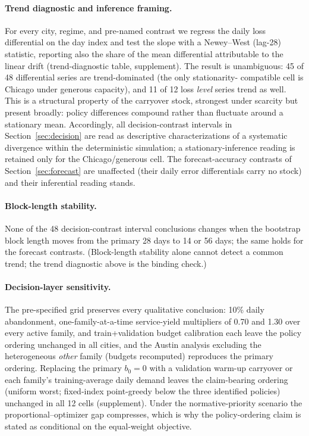 \paragraph{Trend diagnostic and inference framing.} For every city,
regime, and pre-named contrast we regress the daily loss differential on
the day index and test the slope with a Newey--West (lag-28) statistic,
reporting also the share of the mean differential attributable to the
linear drift (trend-diagnostic table, supplement). The result is unambiguous: 45 of
48 differential series are trend-dominated (the only stationarity-
compatible cell is Chicago under generous capacity), and 11 of 12 loss
\emph{level} series trend as well. This is a structural property of the
carryover stock, strongest under scarcity but present broadly: policy
differences compound rather than fluctuate around a stationary mean.
Accordingly, all decision-contrast intervals in Section~\ref{sec:decision} are read as
descriptive characterizations of a systematic divergence within the
deterministic simulation; a stationary-inference reading is retained
only for the Chicago/generous cell. The forecast-accuracy contrasts of
Section~\ref{sec:forecast} are unaffected (their daily error differentials carry no
stock) and their inferential reading stands.

\paragraph{Block-length stability.} None of the 48 decision-contrast
interval conclusions changes when the bootstrap block length moves from
the primary 28 days to 14 or 56 days; the same holds for the forecast
contrasts. (Block-length stability alone cannot detect a common trend; the
trend diagnostic above is the binding check.)

\paragraph{Decision-layer sensitivity.} The pre-specified grid preserves
every qualitative conclusion: 10\% daily abandonment, one-family-at-a-time
service-yield multipliers of 0.70 and 1.30 over every active family, and
train+validation budget calibration each leave the policy ordering
unchanged in all cities, and the Austin analysis excluding the
heterogeneous \emph{other} family (budgets recomputed) reproduces the
primary ordering. Replacing the primary $b_0=0$ with a validation warm-up
carryover or each family's training-average daily demand leaves the
claim-bearing ordering (uniform worst; fixed-index point-greedy below the
three identified policies) unchanged in all 12 cells (supplement). Under
the normative-priority scenario the proportional--optimizer gap
compresses, which is why the policy-ordering claim is stated as
conditional on the equal-weight objective.

